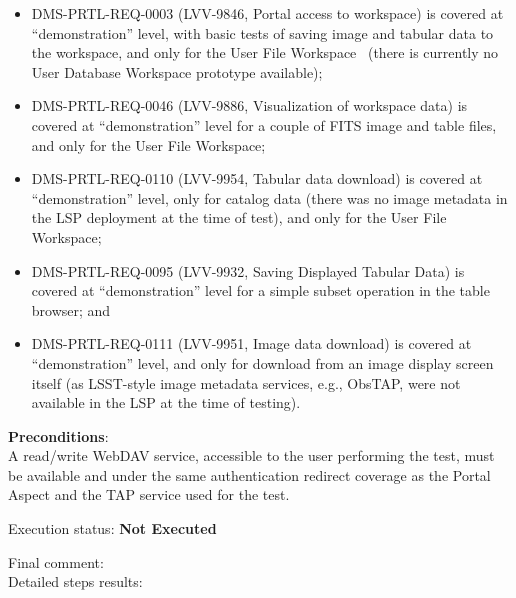 \documentclass[DM,lsstdraft,STR,toc]{lsstdoc}
\providecommand{\tightlist}{
  \setlength{\itemsep}{0pt}\setlength{\parskip}{0pt}}
\begin{document}
\begin{itemize}
\tightlist
\item
  DMS-PRTL-REQ-0003 (LVV-9846, Portal access to workspace) is covered at
  ``demonstration'' level, with basic tests of saving image and tabular
  data to the workspace, and only for the User File Workspace ~(there is
  currently no User Database Workspace prototype available);
\item
  DMS-PRTL-REQ-0046 (LVV-9886, Visualization of workspace data) is
  covered at ``demonstration'' level for a couple of FITS image and
  table files, and only for the User File Workspace;
\item
  DMS-PRTL-REQ-0110 (LVV-9954, Tabular data download) is covered at
  ``demonstration'' level, only for catalog data (there was no image
  metadata in the LSP deployment at the time of test), and only for the
  User File Workspace;~
\item
  DMS-PRTL-REQ-0095 (LVV-9932, Saving Displayed Tabular Data) is covered
  at ``demonstration'' level for a simple subset operation in the table
  browser; and
\item
  DMS-PRTL-REQ-0111 (LVV-9951, Image data download) is covered at
  ``demonstration'' level, and only for download from an image display
  screen itself (as LSST-style image metadata services, e.g., ObsTAP,
  were not available in the LSP at the time of testing).
\end{itemize}

\textbf{ Preconditions}:\\
A read/write WebDAV service, accessible to the user performing the test,
must be available and under the same authentication redirect coverage as
the Portal Aspect and the TAP service used for the test.

Execution status: {\bf Not Executed }

Final comment:\\


Detailed steps results:
\end{document}
